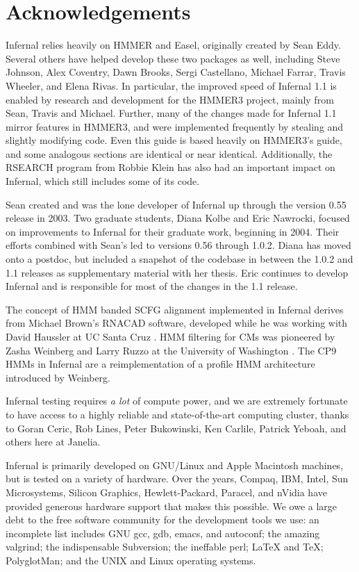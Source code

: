 \section{Acknowledgements}

Infernal relies heavily on HMMER and Easel, originally created by Sean
Eddy. Several others have helped develop these two packages as well,
including Steve Johnson, Alex Coventry, Dawn Brooks, Sergi Castellano,
Michael Farrar, Travis Wheeler, and Elena Rivas.  In particular, the
improved speed of Infernal 1.1 is enabled by research and development
for the HMMER3 project, mainly from Sean, Travis and Michael. Further,
many of the changes made for Infernal 1.1 mirror features in HMMER3,
and were implemented frequently by stealing and slightly modifying
code. Even this guide is based heavily on HMMER3's guide, and some
analogous sections are identical or near identical.  Additionally, the
RSEARCH program \citep{KleinEddy03} from Robbie Klein has also had an
important impact on Infernal, which still includes some of its code.

Sean created and was the lone developer of Infernal up through the
version 0.55 release in 2003. Two graduate students, Diana Kolbe and
Eric Nawrocki, focused on improvements to Infernal for their graduate
work, beginning in 2004. Their efforts combined with Sean's led to
versions 0.56 through 1.0.2. Diana has moved onto a postdoc, but
included a snapshot of the codebase in between the 1.0.2 and 1.1
releases as supplementary material with her thesis. Eric continues to
develop Infernal and is responsible for most of the changes in the 1.1
release.

The concept of HMM banded SCFG alignment implemented in Infernal
derives from Michael Brown's RNACAD software, developed while he was
working with David Haussler at UC Santa Cruz \citep{Brown00}. HMM
filtering for CMs was pioneered by Zasha Weinberg and Larry Ruzzo at
the University of Washington
\citep{WeinbergRuzzo04,WeinbergRuzzo04b,WeinbergRuzzo06}. The CP9 HMMs
in Infernal are a reimplementation of a profile HMM architecture
introduced by Weinberg.

Infernal testing requires \emph{a lot} of compute power, and we are
extremely fortunate to have access to a highly reliable and
state-of-the-art computing cluster, thanks to Goran Ceric, Rob Lines,
Peter Bukowinski, Ken Carlile, Patrick Yeboah, and others here at
Janelia.

Infernal is primarily developed on GNU/Linux and Apple Macintosh
machines, but is tested on a variety of hardware. Over the years,
Compaq, IBM, Intel, Sun Microsystems, Silicon Graphics,
Hewlett-Packard, Paracel, and nVidia have provided generous hardware
support that makes this possible. We owe a large debt to the free
software community for the development tools we use: an incomplete
list includes GNU gcc, gdb, emacs, and autoconf; the amazing valgrind;
the indispensable Subversion; the ineffable perl; LaTeX and TeX;
PolyglotMan; and the UNIX and Linux operating systems.

\label{manualend}

